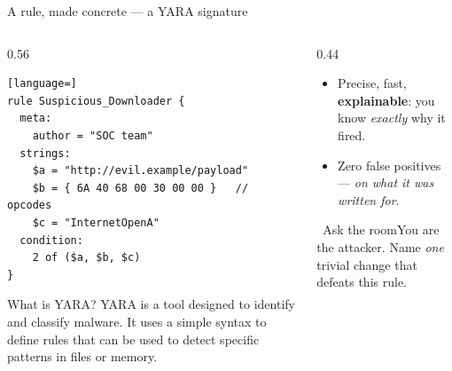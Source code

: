 \documentclass[aspectratio=169,10pt]{beamer}
\newcommand{\term}[1]{{\color{mlink}\textbf{#1}}}         %
\newcommand{\ask}[1]{%
  \begin{exampleblock}{\small\ding{45}\ Ask the room}\small #1\end{exampleblock}}
\begin{document}
\begin{frame}[fragile]{A rule, made concrete --- a YARA signature}
  \begin{columns}[T]
    \begin{column}{0.56\textwidth}
      \begin{lstlisting}[language=]
rule Suspicious_Downloader {
  meta:
    author = "SOC team"
  strings:
    $a = "http://evil.example/payload"
    $b = { 6A 40 68 00 30 00 00 }   // opcodes
    $c = "InternetOpenA"
  condition:
    2 of ($a, $b, $c)
}
      \end{lstlisting}

      \begin{block}{What is YARA?}
        YARA is a tool designed to identify and classify malware. It uses a simple syntax to define rules that can be used to detect specific patterns in files or memory.
      \end{block}
    \end{column}
    \begin{column}{0.44\textwidth}
      \begin{itemize}\small
        \item Precise, fast, \term{explainable}: you know \emph{exactly} why it
              fired.
        \item Zero false positives --- \emph{on what it was written for}.
      \end{itemize}
      \ask{You are the attacker. Name \emph{one} trivial change that defeats this
      rule.\\[0.2em]
      }
    \end{column}
  \end{columns}
\end{frame}
\end{document}
